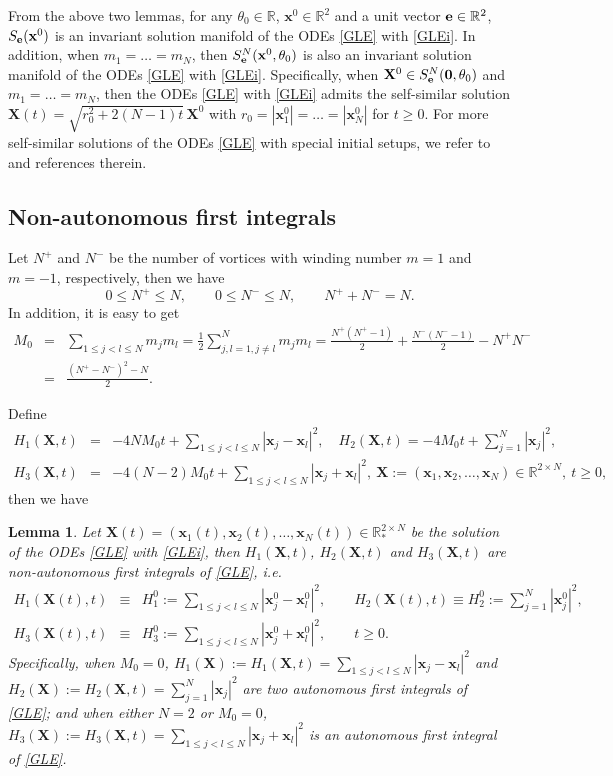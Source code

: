 \documentclass{aims}
\theoremstyle{plain}
\newtheorem{lemma}{Lemma}[section]
\theoremstyle{definition}
\newcommand{\bx}{{\mathbf x}}
\newcommand{\bX}{{\mathbf X}}
\newcommand{\nn}{\nonumber}
\newcommand{\bea}{\begin{eqnarray}}
\newcommand{\eea}{\end{eqnarray} }
\begin{document}
From the above two lemmas, for any $\theta_0\in{\mathbb R}$, $\bx^0\in {\mathbb R}^2$ and a unit vector ${\bf e}\in {\mathbb R}^2$, $S_{{\bf e}}(\bx^0)$ is an invariant solution manifold
of the ODEs \eqref{GLE} with \eqref{GLEi}. In addition,
when $m_1=\ldots=m_N$, then  $S_{{\bf e}}^N(\bx^0,\theta_0)$
is also an invariant solution manifold
of the ODEs \eqref{GLE} with \eqref{GLEi}.
Specifically, when  $\bX^0\in S_{{\bf e}}^N({\bf 0},\theta_0)$ and $m_1=\ldots=m_N$, then the ODEs \eqref{GLE} with \eqref{GLEi}
admits the self-similar solution
$\bX(t)=\sqrt{r_0^2+2(N-1)t}\,\bX^0$ with $r_0=|\bx_1^0|=\ldots=|\bx_N^0|$
for $t\ge0$. For more self-similar solutions of the ODEs \eqref{GLE} with special initial setups,
we refer to \cite{Zhang1,Zhang2} and references therein.

\subsection{Non-autonomous first integrals} Let $N^{+}$ and $N^{-}$ be the number of vortices with winding
number $m=1$ and $m=-1$, respectively, then we have
\[0\le N^+\le N,\qquad 0\le N^-\le N, \qquad   N^++N^-=N.\]
In addition, it is easy to get
\bea\label{mjml}
M_0&=&\sum_{1\leq j<l\leq
N}m_jm_l=\frac{1}{2}\sum_{j,l=1,j\ne l}^N m_jm_l
=\frac{N^{+}(N^{+}-1)}{2}+\frac{N^{-}(N^{-}-1)}{2}-N^{+}N^{-}\nn\\
&=&\frac{(N^{+}-N^{-})^2-N}{2}.
\eea

Define %
\bea\label{H12}
H_1(\mathbf{X},t)&=&-4NM_0t+\sum_{1\leq j<l\leq
N}|\mathbf{x}_j-\mathbf{x}_l|^2,\quad
H_2(\mathbf{X},t)=-4M_0t+\sum_{j=1}^{ N}|\mathbf{x}_j|^2, \\
\label{H13}
H_3(\mathbf{X},t)&=&-4(N-2)M_0t+\sum_{1\leq j<l\leq
N}|\mathbf{x}_j+\mathbf{x}_l|^2,\
\bX:=(\bx_1,\bx_2,\ldots, \bx_N)\in {\mathbb R}^{2\times N}, \ t\ge0,\qquad
\eea
then we have

\begin{lemma}\label{lem1}
Let $\bX(t)=(\bx_1(t),\bx_2(t),\ldots, \bx_N(t))\in {\mathbb R}_*^{2\times N}$
be the solution of the ODEs \eqref{GLE} with \eqref{GLEi},  then
$H_1(\bX,t)$, $H_2(\bX,t)$ and $H_3(\bX,t)$
are  non-autonomous first integrals of \eqref{GLE}, i.e.
\bea \label{fi11}
H_1(\mathbf{X}(t), t)&\equiv&H_1^0:=\sum_{1\leq j<l\leq
N}|\mathbf{x}_j^0-\mathbf{x}_l^0|^2,\qquad H_2(\mathbf{X}(t), t)\equiv  H_2^0:=\sum_{j=1}^{N}|\mathbf{x}_j^0|^2, \\
\label{fi12}
H_3(\mathbf{X}(t), t)&\equiv&H_3^0:=\sum_{1\leq j<l\leq
N}|\mathbf{x}_j^0+\mathbf{x}_l^0|^2, \qquad t\ge0.
\eea
Specifically, when $M_0=0$, $H_1(\bX):=H_1(\bX,t)=\sum_{1\le j<l\le N}|\bx_j-\bx_l|^2$ and $H_2(\bX):=H_2(\bX,t)=\sum_{j=1}^N|\bx_j|^2$
are two autonomous first integrals of \eqref{GLE}; and
when either $N=2$ or $M_0=0$, $H_3(\bX):=H_3(\bX,t)=\sum_{1\le j<l\le N}|\bx_j+\bx_l|^2$ is an autonomous first integral of \eqref{GLE}.
\end{lemma}
\end{document}
